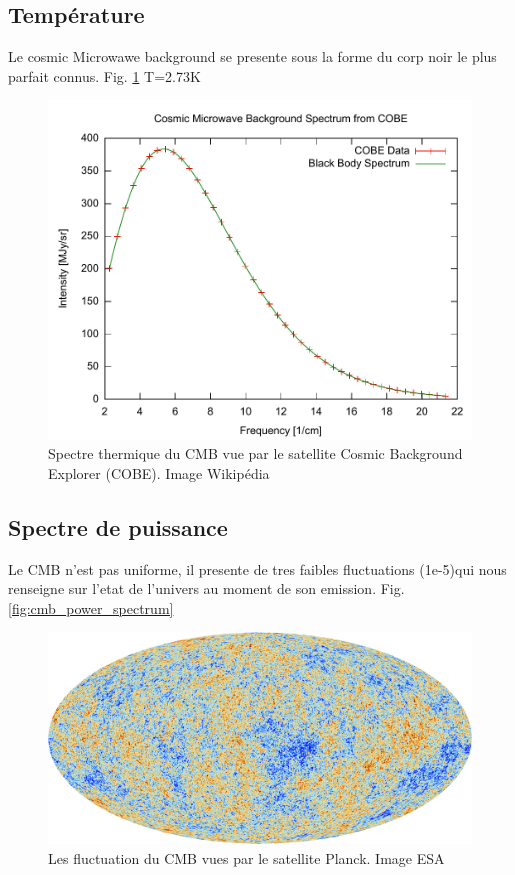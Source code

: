 \subsection{Température}
Le cosmic Microwawe background se presente sous la forme du corp noir le plus parfait connus.
Fig. \ref{fig:cmb_thermal_spectrum}
T=2.73K


\begin{figure}[bth]
        \includegraphics[width=.95\linewidth]{img/01/Cmbr.pdf} 
        \caption{Spectre thermique du CMB vue par le satellite Cosmic Background Explorer (COBE). 
        Image Wikipédia}
 		\label{fig:cmb_thermal_spectrum}
\end{figure}




\subsection{Spectre de puissance}

Le CMB n'est pas uniforme, il presente de tres faibles fluctuations (1e-5)qui nous renseigne sur l'etat de l'univers au moment de son emission.
Fig. \ref{fig:cmb_power_spectrum}

\begin{figure}[bth]
        \includegraphics[width=.95\linewidth]{img/01/CMB.jpeg} 
        \caption{Les fluctuation du CMB vues par le satellite Planck. 
        Image ESA}
 		\label{fig:cmb}
\end{figure}


